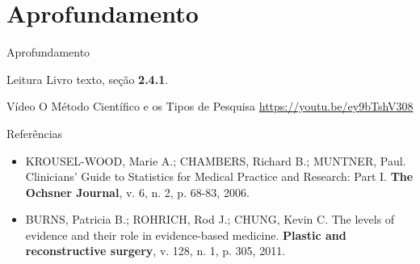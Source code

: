\documentclass{beamer}
\begin{document}

\section{Aprofundamento}

\begin{frame}{Aprofundamento}
  \begin{block}{Leitura}
    Livro texto, seção {\bf 2.4.1}.
  \end{block}
  \begin{block}{Vídeo}
    O Método Científico e os Tipos de Pesquisa \href{https://youtu.be/ey9bTshV308}{https://youtu.be/ey9bTshV308}
  \end{block}

\end{frame}

\begin{frame}{Referências}
  \begin{itemize}
    \tiny
  \item KROUSEL-WOOD, Marie A.; CHAMBERS, Richard B.; MUNTNER, Paul. Clinicians' Guide to Statistics for Medical Practice and Research: Part I. {\bf The Ochsner Journal}, v. 6, n. 2, p. 68-83, 2006.
  \item BURNS, Patricia B.; ROHRICH, Rod J.; CHUNG, Kevin C. The levels of evidence and their role in evidence-based medicine. {\bf Plastic and reconstructive surgery}, v. 128, n. 1, p. 305, 2011.
  \end{itemize}
\end{frame}







\end{document}
